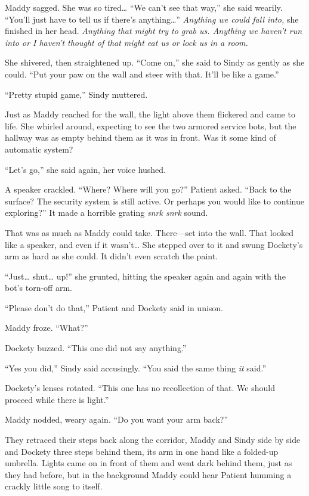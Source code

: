 \documentclass[10pt]{article}
\begin{document}
Maddy sagged. She was so tired\ldots{} ``We can't see that way,'' she
said wearily. ``You'll just have to tell us if there's
anything\ldots{}'' \emph{Anything we could fall into,} she finished in
her head. \emph{Anything that might try to grab us. Anything we haven't
run into or I haven't thought of that might eat us or lock us in a
room.}

She shivered, then straightened up. ``Come on,'' she said to Sindy as
gently as she could. ``Put your paw on the wall and steer with that.
It'll be like a game.''

``Pretty stupid game,'' Sindy muttered.

Just as Maddy reached for the wall, the light above them flickered and
came to life. She whirled around, expecting to see the two armored
service bots, but the hallway was as empty behind them as it was in
front. Was it some kind of automatic system?

``Let's go,'' she said again, her voice hushed.

A speaker crackled. ``Where? Where will you go?'' Patient asked. ``Back
to the surface? The security system is still active. Or perhaps you
would like to continue exploring?'' It made a horrible grating
\emph{snrk snrk} sound.

That was as much as Maddy could take. There---set into the wall. That
looked like a speaker, and even if it wasn't\ldots{} She stepped over to
it and swung Dockety's arm as hard as she could. It didn't even scratch
the paint.

``Just\ldots{} shut\ldots{} up!'' she grunted, hitting the speaker again
and again with the bot's torn-off arm.

``Please don't do that,'' Patient and Dockety said in unison.

Maddy froze. ``What?''

Dockety buzzed. ``This one did not say anything.''

``Yes you did,'' Sindy said accusingly. ``You said the same thing
\emph{it} said.''

Dockety's lenses rotated. ``This one has no recollection of that. We
should proceed while there is light.''

Maddy nodded, weary again. ``Do you want your arm back?''

They retraced their steps back along the corridor, Maddy and Sindy side
by side and Dockety three steps behind them, its arm in one hand like a
folded-up umbrella. Lights came on in front of them and went dark behind
them, just as they had before, but in the background Maddy could hear
Patient humming a crackly little song to itself.
\end{document}
